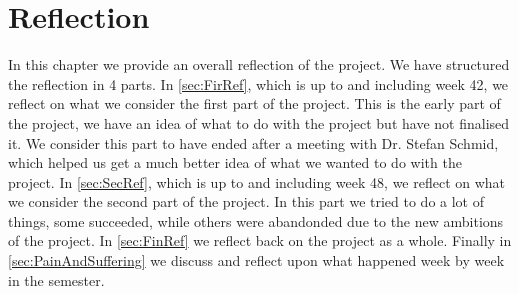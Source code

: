 \chapter{Reflection}\label{cha:weeklyProg}
In this chapter we provide an overall reflection of the project. We have
structured the reflection in 4 parts. In \autoref{sec:FirRef}, which is up to
and including week 42, we reflect on what we consider the first part of the
project. This is the early part of the project, we have an idea of what to do
with the project but have not finalised it. We consider this part to have ended
after a meeting with Dr. Stefan Schmid, which helped us get a much better idea
of what we wanted to do with the project. In \autoref{sec:SecRef}, which is up
to and including week 48, we reflect on what we consider the second part of the
project. In this part we tried to do a lot of things, some succeeded, while
others were abandonded due to the new ambitions of the project. In
\autoref{sec:FinRef} we reflect back on the project as a whole. Finally in
\autoref{sec:PainAndSuffering} we discuss and reflect upon what happened week
by week in the semester.

\newpage
\newpage
\newpage


